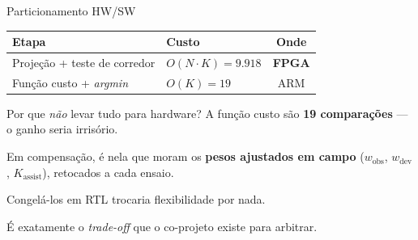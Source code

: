 \documentclass[aspectratio=169, 11pt]{beamer}
\begin{document}
\begin{frame}{Particionamento HW/SW}
\begin{center}
\begin{tabular}{@{}llc@{}}
\toprule
\textbf{Etapa} & \textbf{Custo} & \textbf{Onde} \\
\midrule
Projeção + teste de corredor & $O(N\cdot K) = \mathbf{9.918}$ & \alert{\textbf{FPGA}} \\
Função custo + \emph{argmin} & $O(K) = 19$ & ARM \\
\bottomrule
\end{tabular}
\end{center}

\vspace{5mm}
\begin{block}{Por que \emph{não} levar tudo para hardware?}
A função custo são \textbf{19 comparações} --- o ganho seria irrisório.

Em compensação, é nela que moram os \textbf{pesos ajustados em campo}
($w_{\text{obs}}$, $w_{\text{dev}}$, $K_{\text{assist}}$), retocados a cada ensaio.

\vspace{2mm}
\centering\alert{Congelá-los em RTL trocaria flexibilidade por nada.}
\end{block}

\vspace{2mm}
\centering\footnotesize
É exatamente o \emph{trade-off} que o co-projeto existe para arbitrar.
\end{frame}
\end{document}
